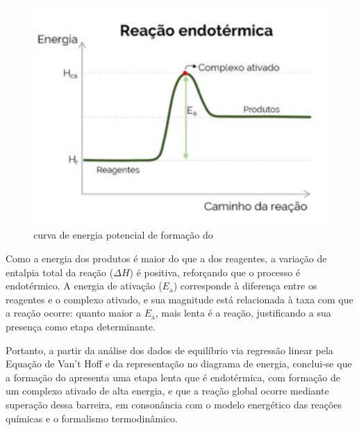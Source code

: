     \begin{figure}[H]
        \centering
        \includegraphics[width=0.35\linewidth]{fig/grafico.png}
        \caption{curva de energia potencial de formação do }
        \label{diagrama}
    \end{figure}

Como a energia dos produtos é maior do que a dos reagentes, a variação de entalpia total da reação (\(\Delta H\)) é positiva, reforçando que o processo é endotérmico. A energia de ativação (\(E_\text{a}\)) corresponde à diferença entre os reagentes e o complexo ativado, e sua magnitude está relacionada à taxa com que a reação ocorre: quanto maior a \(E_\text{a}\), mais lenta é a reação, justificando a sua presença como etapa determinante.

Portanto, a partir da análise dos dados de equilíbrio via regressão linear pela Equação de Van't Hoff e da representação no diagrama de energia, conclui-se que a formação do  apresenta uma etapa lenta que é endotérmica, com formação de um complexo ativado de alta energia, e que a reação global ocorre mediante superação dessa barreira, em consonância com o modelo energético das reações químicas e o formalismo termodinâmico.
